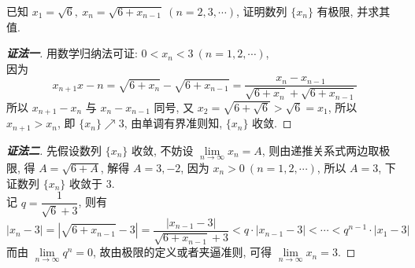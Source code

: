 \begin{example}
    已知 $x_1=\sqrt{6},~x_n=\sqrt{6+x_{n-1}}~  (n=2,3,\cdots)$, 证明数列 $\{x_n\}$ 有极限, 并求其值.
\end{example}
\begin{proof}[{\songti \textbf{证法一}}]
    用数学归纳法可证: $0<x_n<3~  (n=1,2,\cdots)$, \\
    因为 $$x_{n+1}x-{n}=\sqrt{6+x_n}-\sqrt{6+x_{n-1}}=\dfrac{x_n-x_{n-1}}{\sqrt{6+x_n}+\sqrt{6+x_{n-1}}}$$ 所以 $x_{n+1}-x_n$ 与 $x_n-x_{n-1}$ 同号, 
    又 $x_2=\sqrt{6+\sqrt{6}}>\sqrt{6}=x_1$, 所以 $x_{n+1}>x_{n}$, 即 $\{x_n\}\nearrow 3$, 由单调有界准则知, $\{x_n\}$ 收敛.
\end{proof}
\begin{proof}[{\songti \textbf{证法二}}]
    先假设数列 $\{x_n\}$ 收敛, 不妨设 $\lim\limits_{n\to\infty}x_n=A$, 则由递推关系式两边取极限, 得 $A=\sqrt{6+A}$, 解得 $A=3,-2$, 
    因为 $x_n>0~  (n=1,2,\cdots)$, 所以 $A=3$, 下证数列 $\{x_n\}$ 收敛于 $3$.\\
    记 $q=\dfrac{1}{\sqrt{6}+3}$, 则有
    $$|x_n-3|=\left|\sqrt{6+x_{n-1}}-3\right|=\dfrac{|x_{n-1}-3|}{\sqrt{6+x_{n-1}}+3}<q\cdot|x_{n-1}-3|<\cdots<q^{n-1}\cdot|x_1-3|$$
    而由 $\lim\limits_{n\to\infty}q^n=0$, 故由极限的定义或者夹逼准则, 可得 $\lim\limits_{n\to\infty}x_n=3.$
\end{proof}

